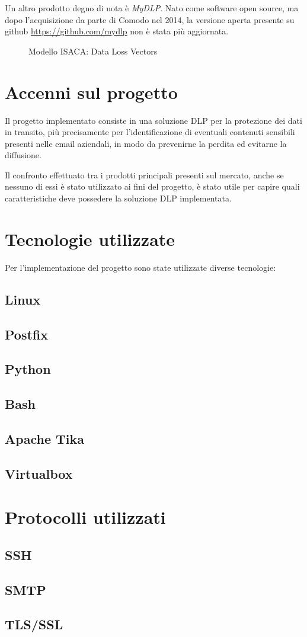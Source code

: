     Un altro prodotto degno di nota è \textit{MyDLP}. Nato come software open source,
    ma dopo l'acquisizione da parte di Comodo nel 2014, la versione aperta presente su github
    \url{https://github.com/mydlp} non è stata più aggiornata.

    \begin{figure}
        \centering
        \caption{Modello ISACA: Data Loss Vectors}\label{ModelloIsaca}
      \end{figure}

\section{Accenni sul progetto}
Il progetto implementato consiste in una soluzione DLP per la protezione dei dati in transito, più precisamente per
l'identificazione di eventuali contenuti sensibili presenti nelle email aziendali, in modo da prevenirne la perdita
ed evitarne la diffusione.

Il confronto effettuato tra i prodotti principali presenti sul mercato, anche se nessuno di essi è stato utilizzato 
ai fini del progetto, è stato utile per capire quali caratteristiche deve possedere la soluzione DLP implementata.

\section{Tecnologie utilizzate}
Per l'implementazione del progetto sono state utilizzate diverse tecnologie:
    \subsection{Linux}
    \subsection{Postfix}
    \subsection{Python}
    \subsection{Bash}
    \subsection{Apache Tika}
    \subsection{Virtualbox}

\section{Protocolli utilizzati}
    \subsection{SSH}
    \subsection{SMTP}
    \subsection{TLS/SSL}